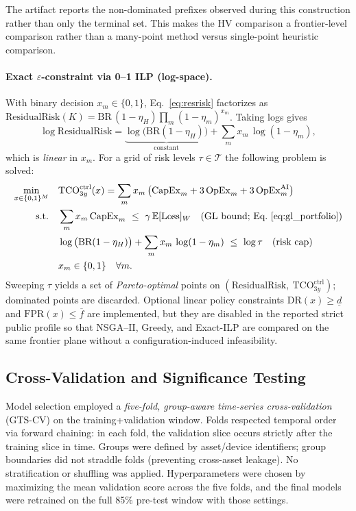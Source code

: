 \documentclass[preprint,12pt]{elsarticle}
\begin{document}
The artifact reports the non-dominated prefixes observed during this construction rather than only the terminal set. This makes the HV comparison a frontier-level comparison rather than a many-point method versus single-point heuristic comparison.

\paragraph{Exact $\varepsilon$-constraint via 0--1 ILP (log-space).}
With binary decision $x_m\in\{0,1\}$, Eq.~\eqref{eq:resrisk} factorizes as
$\text{ResidualRisk}(K)=\text{BR}\,(1-\eta_H)\prod_m (1-\eta_m)^{x_m}$.
Taking logs gives
\[
\log \text{ResidualRisk} = \underbrace{\log\big(\text{BR}(1-\eta_H)\big)}_{\text{constant}} + \sum_m x_m\,\log(1-\eta_m),
\]
which is \emph{linear} in $x_m$. For a grid of risk levels
$\tau\in\mathcal{T}$ the following problem is solved:
\begin{align}
  \min_{x\in\{0,1\}^M}\quad & \mathrm{TCO}^{\mathrm{ctrl}}_{3y}(x)=\sum_m x_m\,\bigl(\mathrm{CapEx}_m + 3\,\mathrm{OpEx}_m + 3\,\mathrm{OpEx}^{\mathrm{AI}}_m\bigr) \label{eq:ilp_obj}\\
\text{s.t.}\quad
& \sum_m x_m\,\mathrm{CapEx}_m \ \le\ \gamma\,\mathbb{E}[\mathrm{Loss}]_{W} \quad \text{(GL bound; Eq.~\ref{eq:gl_portfolio})} \label{eq:ilp_gl}\\
& \log \big(\text{BR}(1-\eta_H)\big) + \sum_m x_m\,\log(1-\eta_m) \ \le\ \log \tau \quad \text{(risk cap)} \label{eq:ilp_risk}\\
& x_m\in\{0,1\}\quad \forall m. \nonumber
\end{align}
Sweeping $\tau$ yields a set of \emph{Pareto-optimal} points on $(\text{ResidualRisk},\ \mathrm{TCO}^{\mathrm{ctrl}}_{3y})$; dominated points are discarded. Optional linear policy constraints $\mathrm{DR}(x)\ge \underline{d}$ and $\mathrm{FPR}(x)\le \overline{f}$ are implemented, but they are disabled in the reported strict public profile so that NSGA--II, Greedy, and Exact-ILP are compared on the same frontier plane without a configuration-induced infeasibility.

\subsection{Cross-Validation and Significance Testing}
\label{sec:cv}

Model selection employed a \emph{five-fold, group-aware time-series cross-validation} (GTS-CV) on the training+validation window. Folds respected temporal order via forward chaining: in each fold, the validation slice occurs strictly after the training slice in time. Groups were defined by asset/device identifiers; group boundaries did not straddle folds (preventing cross-asset leakage). No stratification or shuffling was applied. Hyperparameters were chosen by maximizing the mean validation score across the five folds, and the final models were retrained on the full 85\% pre-test window with those settings. 
\end{document}
